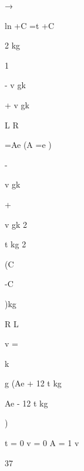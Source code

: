 →\par
ln    +C  =t +C\par
2  kg\par
1\par
-  v gk\par
+  v gk\par
L R\par
=Ae (A =e )\par
-\par
v gk\par
+\par
v gk 2\par
t kg 2\par
(C\par
-C\par
)kg\par
R L\par
v =\par
k\par
g (Ae + 12  t kg\par
Ae - 12  t kg\par
)\par
t = 0 v = 0 A = 1 v\par
37\par


